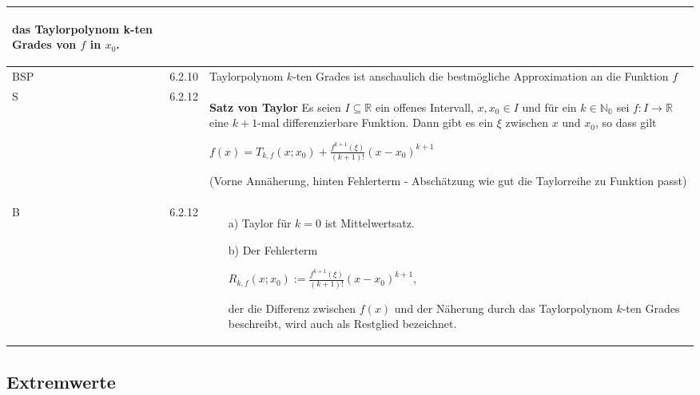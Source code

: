 \begin{longtable}{p{0.75cm} p{1cm} p{16cm}}
\begin{itemize}[topsep=-0.5cm]
                                        das \textbf{Taylorpolynom k-ten Grades} von $f$ in $x_0$.
                        \end{itemize} \vspace{-0cm}  \\
        \midrule
        BSP & 6.2.10&   Taylorpolynom $k$-ten Grades ist anschaulich die bestmögliche Approximation an die Funktion $f$ \\
        \midrule
        S   & 6.2.12&   \textbf{Satz von Taylor} \hfill \break
                        Es seien $I \subseteq \mathbb{R}$ ein offenes Intervall, $x,x_0 \in I$ und für ein $k \in \mathbb{N_0}$ sei $f:I \rightarrow \mathbb{R}$
                        eine $k+1$-mal differenzierbare Funktion. Dann gibt es ein $\xi$ zwischen $x$ und $x_0$, so dass gilt \hfill \break
                        \centerline{$ f(x) = T_{k,f}(x;x_0) + \frac{f^{k+1}(\xi)}{(k+1)!} (x-x_0)^{k+1} $} 
                        (Vorne Annäherung, hinten Fehlerterm - Abschätzung wie gut die Taylorreihe zu Funktion passt) \\
        \midrule
        B   & 6.2.12&   \begin{itemize}[topsep=-0.5cm]
                            \item[a)] Taylor für $k=0$ ist Mittelwertsatz.
                            \item[b)] Der Fehlerterm \hfill \break
                                        \centerline{$ R_{k,f}(x;x_0) := \frac{f^{k+1}(\xi)}{(k+1)!}(x-x_0)^{k+1}$,}
                                        der die Differenz zwischen $f(x)$ und der Näherung durch das Taylorpolynom $k$-ten Grades beschreibt,
                                        wird auch als Restglied bezeichnet.
                        \end{itemize} \vspace{-0cm} \\

        \bottomrule

    \end{longtable}

\subsection{Extremwerte}

